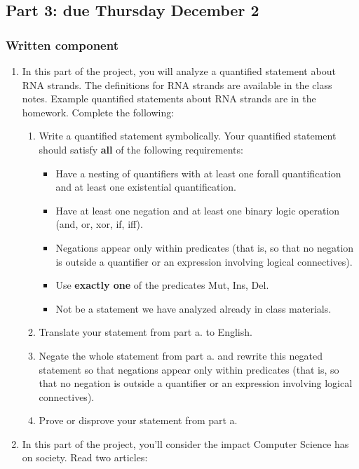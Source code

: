 \newpage
\subsection*{Part 3: due Thursday December 2}
\subsubsection*{Written component}
\begin{enumerate}
    \item In this part of the project, you will analyze a quantified statement about RNA strands. 
    The definitions for RNA strands are available in the class notes. 
    Example quantified statements about RNA strands are in the homework. 
    Complete the following:
    \begin{enumerate}
        \item Write a quantified statement symbolically. Your quantified statement should satisfy {\bf all} of the following requirements:
            \begin{itemize}
                \item Have a nesting of quantifiers with at least one forall quantification 
                and at least one existential quantification.
                \item Have at least one negation and at least one binary logic operation (and, or, xor, if, iff).
                \item Negations appear only within predicates (that is, so that no negation is outside 
                a quantifier or an expression involving logical connectives).
                \item Use {\bf exactly one} of the predicates Mut, Ins, Del.
                \item Not be a statement we have analyzed already in class materials.
            \end{itemize}
        \item Translate your statement from part a. to English.
        \item Negate the whole statement from part a. and rewrite this negated statement so 
        that negations appear only within predicates (that is, so that no negation is outside a 
        quantifier or an expression involving logical connectives).
        \item Prove or disprove your statement from part a.
    \end{enumerate}
    \item In this part of the project, you'll consider the impact Computer Science has on society.
    Read two articles:


\end{enumerate}
